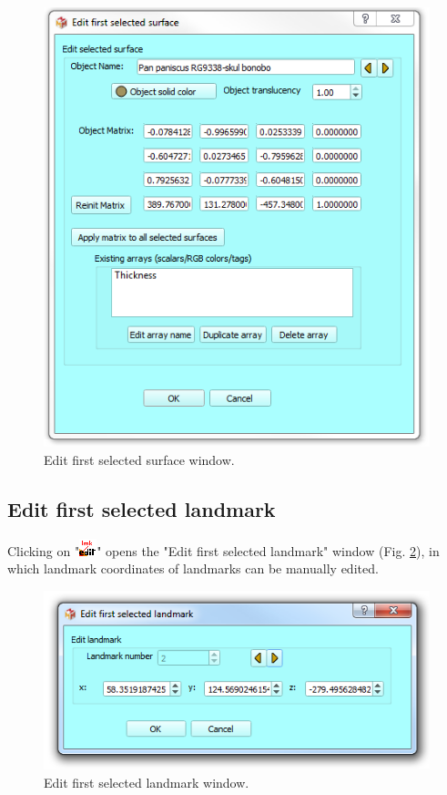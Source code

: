 \begin{figure}
  \centering
  \includegraphics[scale=0.55]{images/06/objects/edit_surface.png} 
	\caption{Edit first selected surface window.}
\label{actor_edit}
 
\end{figure}



\subsection{Edit first selected landmark}
Clicking on "\includegraphics[scale=0.7]{images/06/objects/landmark_edit.png}" opens the "Edit first selected landmark" window (Fig. \ref{landmark_edit}), in which landmark coordinates of landmarks can be manually edited.




\begin{figure}
  \centering
  \includegraphics[scale=0.55]{images/06/objects/edit_landmark.png} 
	\caption{Edit first selected landmark window.}
\label{landmark_edit}
 
\end{figure}

